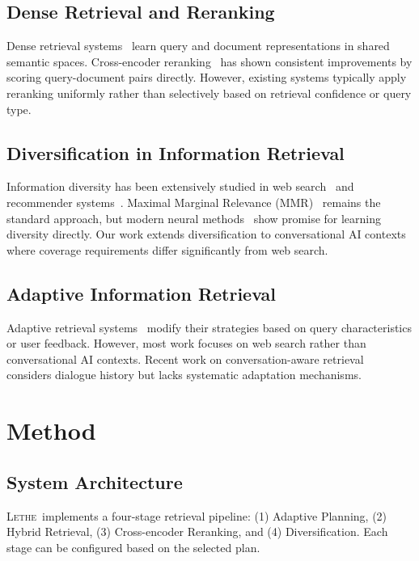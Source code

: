 \documentclass[letterpaper]{article}
\newcommand{\lethe}{\textsc{Lethe}}
\begin{document}
\subsection{Dense Retrieval and Reranking}

Dense retrieval systems~\citep{xiong2020approximate,qu2021rocketqa} learn query and document representations in shared semantic spaces. Cross-encoder reranking~\citep{nogueira2019passage,ren2021rocketqa} has shown consistent improvements by scoring query-document pairs directly. However, existing systems typically apply reranking uniformly rather than selectively based on retrieval confidence or query type.

\subsection{Diversification in Information Retrieval}

Information diversity has been extensively studied in web search~\citep{carbonell1998maximal} and recommender systems~\citep{zhang2008avoiding}. Maximal Marginal Relevance (MMR)~\citep{carbonell1998maximal} remains the standard approach, but modern neural methods~\citep{ma2023finedtuning} show promise for learning diversity directly. Our work extends diversification to conversational AI contexts where coverage requirements differ significantly from web search.

\subsection{Adaptive Information Retrieval}

Adaptive retrieval systems~\citep{zamani2018adaptive} modify their strategies based on query characteristics or user feedback. However, most work focuses on web search rather than conversational AI contexts. Recent work on conversation-aware retrieval~\citep{qu2020open} considers dialogue history but lacks systematic adaptation mechanisms.

\section{Method}

\subsection{System Architecture}

\lethe\ implements a four-stage retrieval pipeline: (1) Adaptive Planning, (2) Hybrid Retrieval, (3) Cross-encoder Reranking, and (4) Diversification. Each stage can be configured based on the selected plan.
\end{document}
